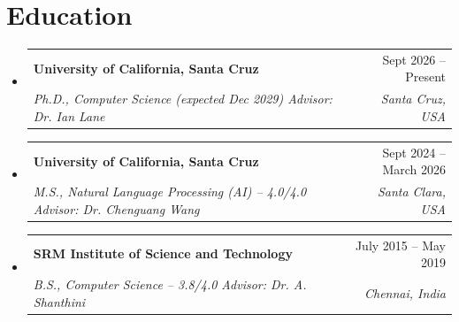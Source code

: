 \documentclass[letterpaper,11pt]{article}
\makeatletter
\newcommand{\resumeSubheading}[4]{
  \vspace{-2pt}\item
    \begin{tabular*}{0.97\textwidth}[t]{l@{\extracolsep{\fill}}r}
      \textbf{#1} & #2 \\
      \textit{\small #3} & \textit{\small #4} \\
    \end{tabular*}\vspace{-10pt}
}
\newcommand{\resumeSubHeadingListStart}{\begin{itemize}[leftmargin=0.15in, label={}]}
\newcommand{\resumeSubHeadingListEnd}{\end{itemize}}
\makeatother
\begin{document}
\section{Education}
\resumeSubHeadingListStart
    \resumeSubheading
        {University of California, Santa Cruz}{Sept 2026 -- Present}
        {Ph.D., Computer Science (expected Dec 2029) \textbullet{} Advisor: Dr. Ian Lane}{Santa Cruz, USA}
    \resumeSubheading
        {University of California, Santa Cruz}{Sept 2024 -- March 2026}
        {M.S., Natural Language Processing (AI) -- 4.0/4.0 \textbullet{} Advisor: Dr. Chenguang Wang}{Santa Clara, USA}
    \resumeSubheading
        {SRM Institute of Science and Technology}{July 2015 -- May 2019}
        {B.S., Computer Science -- 3.8/4.0 \textbullet{} Advisor: Dr. A. Shanthini}{Chennai, India}
\resumeSubHeadingListEnd

\end{document}
